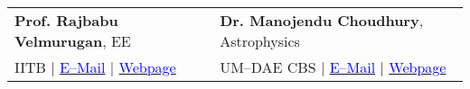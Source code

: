 \documentclass[margin,line]{res}
\begin{document}
\begin{resume}
\begin{tabular}{@{}p{3in}p{3in}}
\textbf{Prof. Rajbabu Velmurugan}, EE & \textbf{Dr. Manojendu Choudhury}, Astrophysics \\
IITB $|$ \href{mailto:rajbabu@ee.iitb.ac.in}{\textcolor{blue}{E--Mail}} $|$ \href{https://www.ee.iitb.ac.in/web/faculty/homepage/rajbabu}{\textcolor{blue}{Webpage}} & UM--DAE CBS $|$ \href{mailto:manojendu@cbs.ac.in}{\textcolor{blue}{E--Mail}} $|$ \href{http://www.cbs.ac.in/people/physics-faculty/manojendu-choudhury}{\textcolor{blue}{Webpage}} \\
\end{tabular}
\vspace{-0.15in}


\end{resume}
\end{document}
